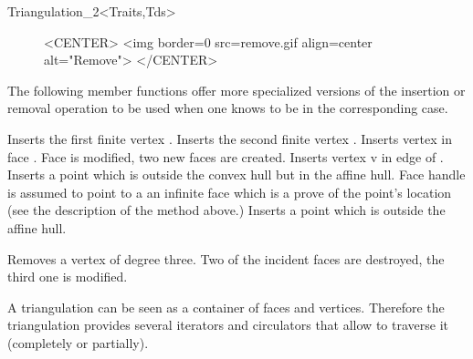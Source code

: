 \begin{ccClassTemplate}{Triangulation_2<Traits,Tds>}
\begin{figure}
\begin{ccHtmlOnly}
<CENTER>
<img border=0 src=remove.gif align=center alt="Remove">
</CENTER>
\end{ccHtmlOnly}
\end{figure}


The following member functions offer more specialized versions of the
insertion or removal operation to be used when one knows to be in the
corresponding case.

{Inserts the first finite  vertex .}
{Inserts the second finite  vertex .}
 {Inserts vertex  in face
. Face  is modified,
two new faces are created.
}
{Inserts vertex v in edge  of .
}
{Inserts 
 a point which is outside the convex hull  but in the affine hull.
Face handle  is assumed to point to a an infinite face
which is a prove of the point's location (see the description of the
 method above.)
}
{Inserts 
 a point which is outside the affine hull.}

{Removes a vertex of degree three. Two of the incident faces are destroyed,
the third one is modified.
}









A triangulation can be seen as a container of faces and vertices.
Therefore the triangulation provides several iterators and circulators
that allow to traverse it (completely or partially).




\end{ccClassTemplate}
